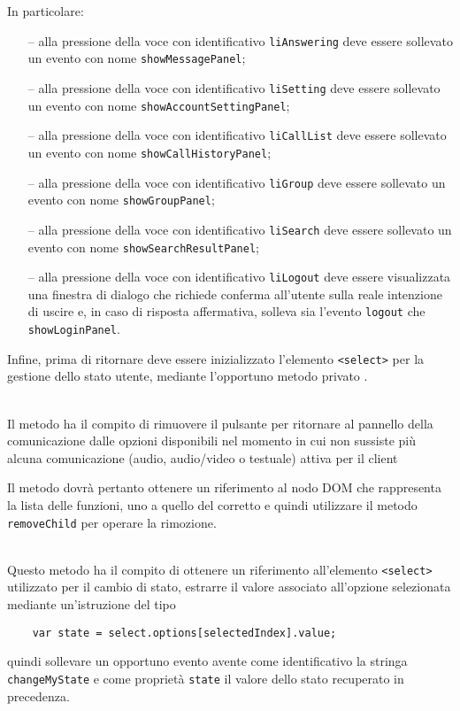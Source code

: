 \begin{description}
  In particolare:
  \begin{itemize}
    \item[--] alla pressione della voce con identificativo \verb'liAnswering' deve essere sollevato un evento con nome \verb'showMessagePanel';
    \item[--] alla pressione della voce con identificativo \verb'liSetting' deve essere sollevato un evento con nome \verb'showAccountSettingPanel';
    \item[--] alla pressione della voce con identificativo \verb'liCallList' deve essere sollevato un evento con nome \verb'showCallHistoryPanel';
    \item[--] alla pressione della voce con identificativo \verb'liGroup' deve essere sollevato un evento con nome \verb'showGroupPanel';
    \item[--] alla pressione della voce con identificativo \verb'liSearch' deve essere sollevato un evento con nome \verb'showSearchResultPanel';
    \item[--] alla pressione della voce con identificativo \verb'liLogout' deve essere visualizzata una finestra di dialogo che richiede conferma all'utente sulla reale intenzione di uscire e, in caso di risposta affermativa, solleva sia l'evento \verb'logout' che \verb'showLoginPanel'.
  \end{itemize}
  
  Infine, prima di ritornare deve essere inizializzato l'elemento \verb'<select>' per la gestione dello stato utente, mediante l'opportuno metodo privato .
  
  \item{}\\
  Il metodo ha il compito di rimuovere il pulsante per ritornare al pannello della comunicazione dalle opzioni disponibili nel momento in cui non sussiste più alcuna comunicazione (audio, audio/video o testuale) attiva per il client
  
   Il metodo dovrà pertanto ottenere un riferimento al nodo DOM che rappresenta la lista delle funzioni, uno a quello del  corretto e quindi utilizzare il metodo \verb'removeChild' per operare la rimozione.
  
  \item{}\\
  Questo metodo ha il compito di ottenere un riferimento all'elemento \verb'<select>' utilizzato per il cambio di stato, estrarre il valore associato all'opzione selezionata mediante un'istruzione del tipo
  \begin{verbatim}
    var state = select.options[selectedIndex].value;
  \end{verbatim}
  quindi sollevare un opportuno evento avente come identificativo la stringa \verb'changeMyState' e come proprietà \verb'state' il valore dello stato recuperato in precedenza.
  

\end{description}
